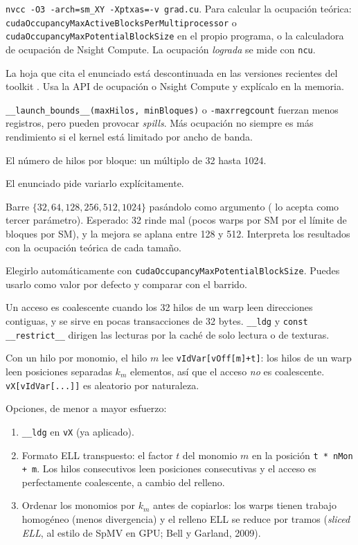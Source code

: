 \como \texttt{nvcc -O3 -arch=sm\_XY -Xptxas=-v grad.cu}. Para calcular la ocupación teórica: \texttt{cudaOccupancyMaxActiveBlocksPerMultiprocessor} o \texttt{cudaOccupancyMaxPotentialBlockSize} en el propio programa, o la calculadora de ocupación de Nsight Compute. La ocupación \emph{lograda} se mide con \texttt{ncu}.

\begin{trampa}
La hoja  que cita el enunciado está descontinuada en las versiones recientes del toolkit \pv. Usa la API de ocupación o Nsight Compute y explícalo en la memoria.
\end{trampa}

\alt \texttt{\_\_launch\_bounds\_\_(maxHilos, minBloques)} o \texttt{-maxrregcount} fuerzan menos registros, pero pueden provocar \emph{spills}. Más ocupación no siempre es más rendimiento si el kernel está limitado por ancho de banda.

\que El número de hilos por bloque: un múltiplo de 32 hasta 1024.

\porque El enunciado pide variarlo explícitamente.

\como Barre $\{32,64,128,256,512,1024\}$ pasándolo como argumento ( lo acepta como tercer parámetro). Esperado: 32 rinde mal (pocos warps por SM por el límite de bloques por SM), y la mejora se aplana entre 128 y 512. Interpreta los resultados con la ocupación teórica de cada tamaño.

\alt Elegirlo automáticamente con \texttt{cudaOccupancyMaxPotentialBlockSize}. Puedes usarlo como valor por defecto y comparar con el barrido.

\que Un acceso es coalescente cuando los 32 hilos de un warp leen direcciones contiguas, y se sirve en pocas transacciones de 32 bytes. \texttt{\_\_ldg} y \texttt{const \_\_restrict\_\_} dirigen las lecturas por la caché de solo lectura o de texturas.

\porque Con un hilo por monomio, el hilo $m$ lee \texttt{vIdVar[vOff[m]+t]}: los hilos de un warp leen posiciones separadas $k_m$ elementos, así que el acceso \emph{no} es coalescente. \texttt{vX[vIdVar[...]]} es aleatorio por naturaleza.

\como Opciones, de menor a mayor esfuerzo:
\begin{enumerate}
\item \texttt{\_\_ldg} en \texttt{vX} (ya aplicado).
\item Formato ELL transpuesto: el factor $t$ del monomio $m$ en la posición \texttt{t * nMon + m}. Los hilos consecutivos leen posiciones consecutivas y el acceso es perfectamente coalescente, a cambio del relleno.
\item Ordenar los monomios por $k_m$ antes de copiarlos: los warps tienen trabajo homogéneo (menos divergencia) y el relleno ELL se reduce por tramos (\emph{sliced ELL}, al estilo de SpMV en GPU; Bell y Garland, 2009).
\end{enumerate}

